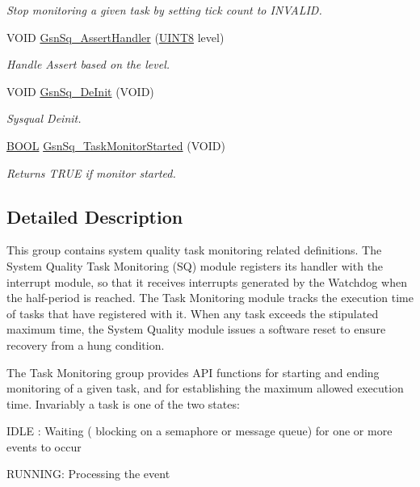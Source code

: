 \begin{DoxyCompactItemize}
\begin{DoxyCompactList}\small\item\em Stop monitoring a given task by setting tick count to INVALID. \end{DoxyCompactList}\item 
VOID \hyperlink{a00675_ga8f76a4cc1c863a3ca744e3c377f3a4bd}{GsnSq\_\-AssertHandler} (\hyperlink{a00660_gab27e9918b538ce9d8ca692479b375b6a}{UINT8} level)
\begin{DoxyCompactList}\small\item\em Handle Assert based on the level. \end{DoxyCompactList}\item 
VOID \hyperlink{a00675_ga14affd26fb768070a8d90706441b8c8d}{GsnSq\_\-DeInit} (VOID)
\begin{DoxyCompactList}\small\item\em Sysqual Deinit. \end{DoxyCompactList}\item 
\hyperlink{a00660_ga1f04022c0a182c51c059438790ea138c}{BOOL} \hyperlink{a00675_gac34869e67e126c75fd2f750c34fe1789}{GsnSq\_\-TaskMonitorStarted} (VOID)
\begin{DoxyCompactList}\small\item\em Returns TRUE if monitor started. \end{DoxyCompactList}\end{DoxyCompactItemize}


\subsection{Detailed Description}
This group contains system quality task monitoring related definitions. The System Quality Task Monitoring (SQ) module registers its handler with the interrupt module, so that it receives interrupts generated by the Watchdog when the half-\/period is reached. The Task Monitoring module tracks the execution time of tasks that have registered with it. When any task exceeds the stipulated maximum time, the System Quality module issues a software reset to ensure recovery from a hung condition. \par
 \par
 The Task Monitoring group provides API functions for starting and ending monitoring of a given task, and for establishing the maximum allowed execution time. Invariably a task is one of the two states:
\begin{DoxyItemize}
\item IDLE : Waiting ( blocking on a semaphore or message queue) for one or more events to occur
\item RUNNING: Processing the event \par

\end{DoxyItemize}

